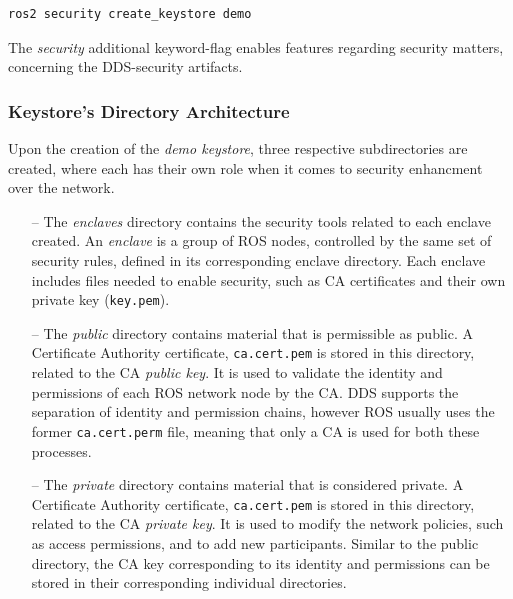 \begin{lstlisting}[title={\textit{Keystore} creation using the proper SROS2 command.}]
ros2 security create_keystore demo
\end{lstlisting}

The \textit{security} additional keyword-flag enables features regarding security matters, concerning the DDS-security artifacts.

\subsubsection{Keystore's Directory Architecture}

Upon the creation of the \textit{demo keystore}, three respective subdirectories are created, where each has their own role when it comes to security enhancment over the network.

\begin{itemize}
    \item[--] The \textit{enclaves} directory contains the security tools related to each enclave created. An \textit{enclave} is a group of ROS nodes, controlled by the same set of security rules, defined in its corresponding enclave directory. Each enclave includes files needed to enable security, such as CA certificates and their own private key (\texttt{key.pem}). %
    \item[--] The \textit{public} directory contains material that is permissible as public. A Certificate Authority certificate, \texttt{ca.cert.pem} is stored in this directory, related to the CA \textit{public key}. It is used to validate the identity and permissions of each ROS network node by the CA. DDS supports the separation of identity and permission chains, however ROS usually uses the former \texttt{ca.cert.perm} file, meaning that only a CA is used for both these processes.
    \item[--] The \textit{private} directory contains material that is considered private. A Certificate Authority certificate, \texttt{ca.cert.pem} is stored in this directory, related to the CA \textit{private key}. It is used to modify the network policies, such as access permissions, and to add new participants. Similar to the public directory, the CA key corresponding to its identity and permissions can be stored in their corresponding individual directories.
\end{itemize}

